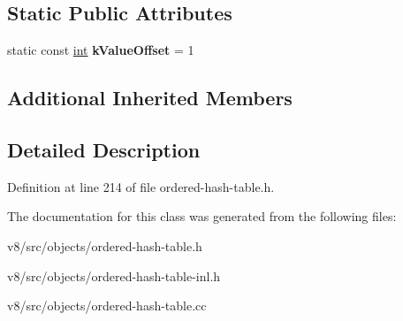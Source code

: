 \subsection*{Static Public Attributes}
\begin{DoxyCompactItemize}
\item 
\mbox{\label{classv8_1_1internal_1_1OrderedHashMap_af9226c777f282b0d357197ff8358cdcf}} 
static const \mbox{\hyperlink{classint}{int}} {\bfseries k\+Value\+Offset} = 1
\end{DoxyCompactItemize}
\subsection*{Additional Inherited Members}


\subsection{Detailed Description}


Definition at line 214 of file ordered-\/hash-\/table.\+h.



The documentation for this class was generated from the following files\+:\begin{DoxyCompactItemize}
\item 
v8/src/objects/ordered-\/hash-\/table.\+h\item 
v8/src/objects/ordered-\/hash-\/table-\/inl.\+h\item 
v8/src/objects/ordered-\/hash-\/table.\+cc\end{DoxyCompactItemize}

